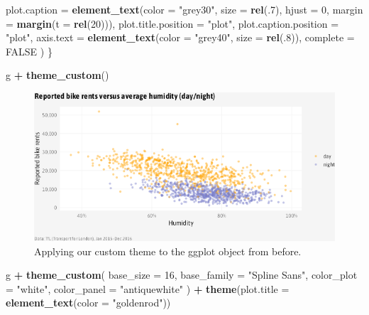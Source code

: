 \documentclass[
]{krantz}
\makeatletter
\newenvironment{Shaded}{\begin{snugshade}}{\end{snugshade}}
\newcommand{\AttributeTok}[1]{\textcolor[rgb]{0.27,0.27,0.27}{#1}}
\newcommand{\ConstantTok}[1]{\textcolor[rgb]{0.37,0.37,0.37}{#1}}
\newcommand{\DecValTok}[1]{\textcolor[rgb]{0.06,0.06,0.06}{#1}}
\newcommand{\FunctionTok}[1]{\textcolor[rgb]{0.27,0.27,0.27}{\textbf{#1}}}
\newcommand{\NormalTok}[1]{#1}
\newcommand{\SpecialCharTok}[1]{\textcolor[rgb]{0.43,0.43,0.43}{\textbf{#1}}}
\newcommand{\StringTok}[1]{\textcolor[rgb]{0.5,0.5,0.5}{#1}}
\newenvironment{kframe}{%
\medskip{}
\setlength{\fboxsep}{.8em}
 \def\at@end@of@kframe{}%
 \ifinner\ifhmode%
  \def\at@end@of@kframe{\end{minipage}}%
  \begin{minipage}{\columnwidth}%
 \fi\fi%
 \def\FrameCommand##1{\hskip\@totalleftmargin \hskip-\fboxsep
 \colorbox{shadecolor}{##1}\hskip-\fboxsep
     \hskip-\linewidth \hskip-\@totalleftmargin \hskip\columnwidth}%
 \MakeFramed {\advance\hsize-\width
   \@totalleftmargin\z@ \linewidth\hsize
   \@setminipage}}%
 {\par\unskip\endMakeFramed%
 \at@end@of@kframe}
\renewenvironment{Shaded}{\begin{kframe}}{\end{kframe}}
\makeatother
\begin{document}
\begin{Shaded}
\begin{Highlighting}[]
      \AttributeTok{plot.caption =} \FunctionTok{element\_text}\NormalTok{(}\AttributeTok{color =} \StringTok{"grey30"}\NormalTok{, }\AttributeTok{size =} \FunctionTok{rel}\NormalTok{(.}\DecValTok{7}\NormalTok{), }\AttributeTok{hjust =} \DecValTok{0}\NormalTok{,}
                                  \AttributeTok{margin =} \FunctionTok{margin}\NormalTok{(}\AttributeTok{t =} \FunctionTok{rel}\NormalTok{(}\DecValTok{20}\NormalTok{))),}
      \AttributeTok{plot.title.position =} \StringTok{"plot"}\NormalTok{,}
      \AttributeTok{plot.caption.position =} \StringTok{"plot"}\NormalTok{,}
      \AttributeTok{axis.text =} \FunctionTok{element\_text}\NormalTok{(}\AttributeTok{color =} \StringTok{"grey40"}\NormalTok{, }\AttributeTok{size =} \FunctionTok{rel}\NormalTok{(.}\DecValTok{8}\NormalTok{)),}
      \AttributeTok{complete =} \ConstantTok{FALSE}
\NormalTok{  )}
\NormalTok{\}}
\end{Highlighting}
\end{Shaded}

\begin{Shaded}
\begin{Highlighting}[]
\NormalTok{g }\SpecialCharTok{+} \FunctionTok{theme\_custom}\NormalTok{()}
\end{Highlighting}
\end{Shaded}

\begin{figure}
\centering
\includegraphics{bookdown_files/figure-latex/06customThemeApplied-1.png}
\caption{\label{fig:06customThemeApplied}Applying our custom theme to the ggplot object from before.}
\end{figure}

\begin{Shaded}
\begin{Highlighting}[]
\NormalTok{g }\SpecialCharTok{+}
  \FunctionTok{theme\_custom}\NormalTok{(}
    \AttributeTok{base\_size =} \DecValTok{16}\NormalTok{, }\AttributeTok{base\_family =} \StringTok{"Spline Sans"}\NormalTok{,}
    \AttributeTok{color\_plot =} \StringTok{"white"}\NormalTok{, }\AttributeTok{color\_panel =} \StringTok{"antiquewhite"}
\NormalTok{  ) }\SpecialCharTok{+}
  \FunctionTok{theme}\NormalTok{(}\AttributeTok{plot.title =} \FunctionTok{element\_text}\NormalTok{(}\AttributeTok{color =} \StringTok{"goldenrod"}\NormalTok{))}
\end{Highlighting}
\end{Shaded}
\end{document}
